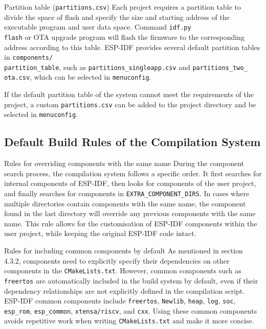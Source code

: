 \documentclass[a4paper,12pt]{book}
\begin{document}
\begin{term}{Partition table (\texttt{partitions.csv})}
    Each project requires a partition table to divide the space of flash and specify the size and starting address of the executable program and user data space. Command \verb|idf.py |\\ \verb|flash| or OTA upgrade program will flash the firmware to the corresponding address according to this table. ESP-IDF provides several default partition tables in \verb|components/|\\ \verb|partition_table|, such as \verb|partitions_singleapp.csv| and \verb|partitions_two_|\\ \verb|ota.csv|, which can be selected in \verb|menuconfig|.
    
    \vspace{6pt}
    If the default partition table of the system cannot meet the requirements of the project, a custom \verb|partitions.csv| can be added to the project directory and be selected in \verb|menuconfig|.
\end{term}

\subsection{Default Build Rules of the Compilation System}
\begin{term}{Rules for overriding components with the same name}
    During the component search process, the compilation system follows a specific order. It first searches for internal components of ESP-IDF, then looks for components of the user project, and finally searches for components in \verb|EXTRA_COMPONENT_DIRS|. In cases where multiple directories contain components with the same name, the component found in the last directory will override any previous components with the same name. This rule allows for the customisation of ESP-IDF components within the user project, while keeping the original ESP-IDF code intact.
\end{term}

\begin{term}{Rules for including common components by default}
    As mentioned in section 4.3.2, components need to explicitly specify their dependencies on other components in the \verb|CMakeLists.txt|. However, common components such as \verb|freertos| are automatically included in the build system by default, even if their dependency relationships are not explicitly defined in the compilation script. ESP-IDF common components include \verb|freertos|, \verb|Newlib|, \verb|heap|, \verb|log|, \verb|soc|, \verb|esp_rom|, \verb|esp_common|, \verb|xtensa/riscv|, and \verb|cxx|. Using these common components avoids repetitive work when writing \verb|CMakeLists.txt| and make it more concise.
\end{term}
\end{document}
